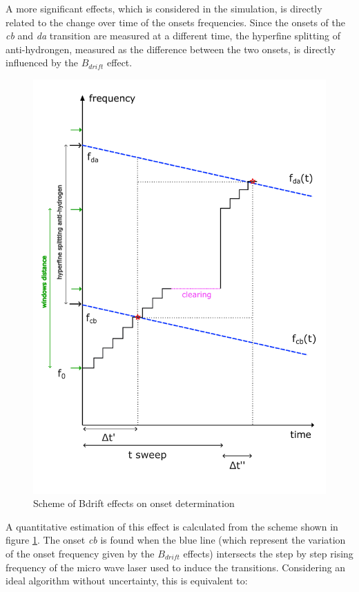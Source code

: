 \documentclass[11pt,a4paper,oneside]{article}
\begin{document}
A more significant effects, which is considered in the simulation, is directly related to the change over time of the onsets frequencies. Since the onsets of the \textit{cb} and \textit{da} transition are measured at a different time, the hyperfine splitting of anti-hydrongen, measured as the difference between the two onsets, is directly influenced by the $B_{drift}$ effect. 

\begin{figure}[hbtp]
\centering
\includegraphics[scale= 0.60]{SchemeBdrift.pdf}
\caption{Scheme of Bdrift effects on onset determination}\label{fig:SchemeBdrift}
\end{figure}


A quantitative estimation of this effect is calculated from the scheme shown in figure \ref{fig:SchemeBdrift}. The onset \textit{cb} is found when the blue line (which represent the variation of the onset frequency given by the $B_{drift}$ effects) intersects the step by step rising frequency of the micro wave laser used to induce the transitions. Considering an ideal algorithm without uncertainty, this is equivalent to:
\end{document}
